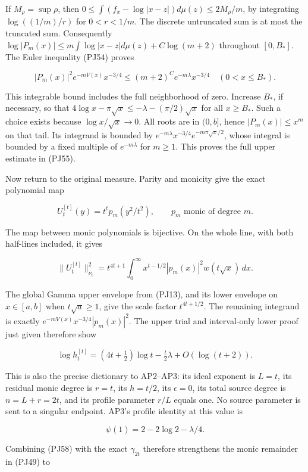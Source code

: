 \documentclass[10pt]{article}
\begin{document}
If \(M_\rho=\sup\rho\), then \(0\le\int(f_x-\log|x-z|)d\mu(z)\le2M_\rho/m\), by integrating \(\log((1/m)/r)\) for \(0<r<1/m\). The discrete untruncated sum is at most the truncated sum. Consequently \(\log|P_m(x)|\le m\int\log|x-z|d\mu(z)+C\log(m+2)\) throughout \([0,B_*]\). The Euler inequality (PJ54) proves

\[
|P_m(x)|^2e^{-mV(x)}x^{-3/4}
\le(m+2)^Ce^{-m\lambda}x^{-3/4}
\quad(0<x\le B_*).
\]

This integrable bound includes the full neighborhood of zero. Increase \(B_*\), if necessary, so that \(4\log x-\pi\sqrt{x}\le-\lambda-(\pi/2)\sqrt{x}\) for all \(x\ge B_*\). Such a choice exists because \(\log x/\sqrt{x}\to0\). All roots are in \((0,b]\), hence \(|P_m(x)|\le x^m\) on that tail. Its integrand is bounded by \(e^{-m\lambda}x^{-3/4}e^{-m\pi\sqrt{x}/2}\), whose integral is bounded by a fixed multiple of \(e^{-m\lambda}\) for \(m\ge1\). This proves the full upper estimate in (PJ55).

Now return to the original measure. Parity and monicity give the exact polynomial map

\[
U_t^{[t]}(y)=t^t p_m(y^2/t^2),\qquad p_m\text{ monic of degree }m.
\tag{PJ56}
\]

The map between monic polynomials is bijective. On the whole line, with both half-lines included, it gives

\[
\|U_t^{[t]}\|_{\nu_t}^2
=t^{4t+1}\int_0^\infty x^{t-1/2}|p_m(x)|^2w(t\sqrt{x})\,dx.
\tag{PJ57}
\]

The global Gamma upper envelope from (PJ13), and its lower envelope on \(x\in[a,b]\) when \(t\sqrt a\ge1\), give the scale factor \(t^{4t+1/2}\). The remaining integrand is exactly \(e^{-mV(x)}x^{-3/4}|p_m(x)|^2\). The upper trial and interval-only lower proof just given therefore show

\[
\log h_t^{[t]}=(4t+\tfrac12)\log t-\tfrac t2\lambda+O(\log(t+2)).
\tag{PJ58}
\]

This is also the precise dictionary to AP2--AP3: its ideal exponent is \(L=t\), its residual monic degree is \(r=t\), its \(h=t/2\), its \(\epsilon=0\), its total source degree is \(n=L+r=2t\), and its profile parameter \(r/L\) equals one. No source parameter is sent to a singular endpoint. AP3's profile identity at this value is

\[
\psi(1)=2-2\log2-\lambda/4.
\tag{PJ59}
\]

Combining (PJ58) with the exact \(\gamma_{2t}\) therefore strengthens the monic remainder in (PJ49) to
\end{document}
